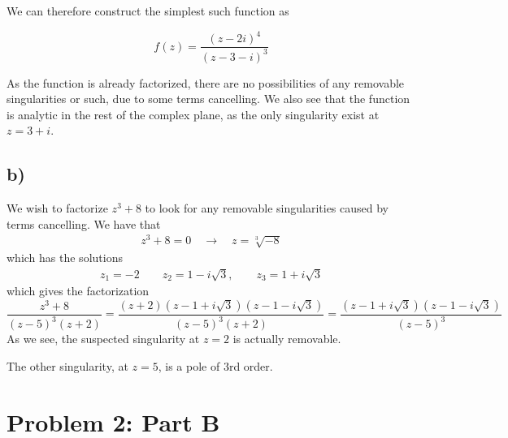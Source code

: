 \documentclass[10pt,a4paper]{article}
\begin{document}
We can therefore construct the simplest such function as

\begin{equation}
    f(z) = \frac{(z-2i)^4}{(z-3-i)^3}
\end{equation}

As the function is already factorized, there are no possibilities of any removable singularities or such, due to some terms cancelling. We also see that the function is analytic in the rest of the complex plane, as the only singularity exist at $z=3+i$.




\subsection*{b)}
We wish to factorize $z^3+8$ to look for any removable singularities caused by terms cancelling. We have that
\begin{align}
    z^3 + 8 = 0 \quad \rightarrow \quad
    z = \sqrt[3]{-8}
\end{align}
which has the solutions
\begin{align}
z_1 = -2 \quad\quad z_2 = 1-i\sqrt{3}, \quad\quad z_3 = 1+i\sqrt{3}
\end{align}
which gives the factorization
\begin{equation}
    \frac{z^3+8}{(z-5)^3(z+2)} = \frac{(z+2)(z-1+i\sqrt{3})(z-1-i\sqrt{3})}{(z-5)^3(z+2)} = \frac{(z-1+i\sqrt{3})(z-1-i\sqrt{3})}{(z-5)^3}
\end{equation}
As we see, the suspected singularity at $z=2$ is actually removable.

The other singularity, at $z=5$, is a pole of 3rd order. 





\section*{Problem 2: Part B}
\end{document}
